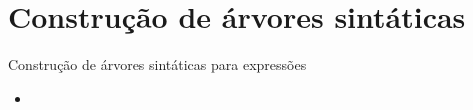 \section{Construção de árvores sintáticas}

\begin{frame}[fragile]{Construção de árvores sintáticas para expressões}

    \begin{itemize}
        \item 
    \end{itemize}

\end{frame}

